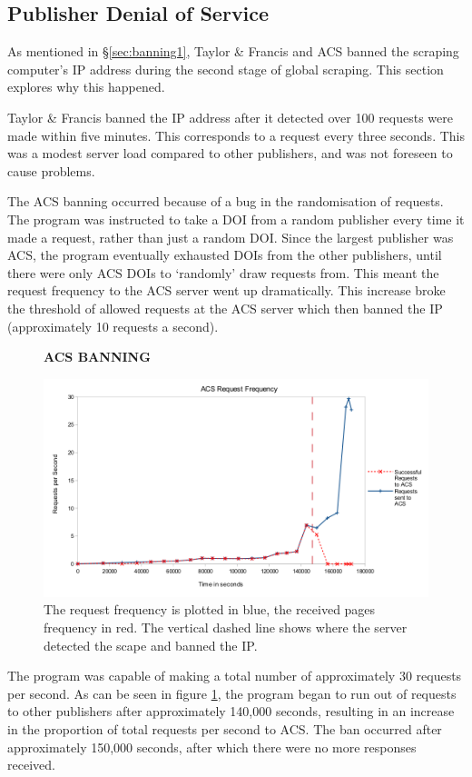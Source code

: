 \subsection{Publisher Denial of Service}
\label{sec:banning2}
As mentioned in \S\ref{sec:banning1}, Taylor \& Francis and ACS banned the scraping computer's IP address during the second stage of global scraping. This section explores why this happened.


Taylor \& Francis banned the IP address after it detected over 100 requests were made within five minutes. This corresponds to a request every three seconds. This was a modest server load compared to other publishers, and was not foreseen to cause problems.

The ACS banning occurred because of a bug in the randomisation of requests. The program was instructed to take a DOI from a random publisher every time it made a request, rather than just a random DOI. Since the largest publisher was ACS, the program eventually exhausted DOIs from the other publishers, until there were only ACS DOIs to `randomly' draw requests from. This meant the request frequency to the ACS server went up dramatically. This increase broke the threshold of allowed requests at the ACS server which then banned the IP (approximately 10 requests a second).

\begin{figure}[H]
    \centering
    \textbf{ACS BANNING}\par\medskip
    \includegraphics[width=\textwidth]{Data_Acquisition/ACS_crash_line.png}
    \caption[Request Frequency Leading to ACS Ban]{The request frequency is plotted in blue, the received pages frequency in red. The vertical dashed line shows where the server detected the scape and banned the IP.}
     \label{fig:ACSBAN}
\end{figure}
The program was capable of making a total number of approximately 30 requests per second. As can be seen in figure \ref{fig:ACSBAN}, the program began to run out of requests to other publishers after approximately 140,000 seconds, resulting in an increase in the proportion of total requests per second to ACS. The ban occurred after approximately 150,000 seconds, after which there were no more responses received.

